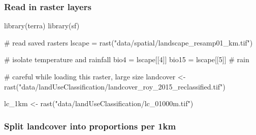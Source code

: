 \documentclass[
]{article}
\newenvironment{Shaded}{}{}
\newcommand{\CommentTok}[1]{\textcolor[rgb]{0.00,0.50,0.00}{#1}}
\newcommand{\DecValTok}[1]{#1}
\newcommand{\KeywordTok}[1]{\textcolor[rgb]{0.00,0.00,1.00}{#1}}
\newcommand{\NormalTok}[1]{#1}
\newcommand{\StringTok}[1]{\textcolor[rgb]{0.00,0.50,0.50}{#1}}
\begin{document}
\hypertarget{read-in-raster-layers}{%
\subsubsection{Read in raster layers}\label{read-in-raster-layers}}

\begin{Shaded}
\begin{Highlighting}[]
\KeywordTok{library}\NormalTok{(terra)}
\KeywordTok{library}\NormalTok{(sf)}
\end{Highlighting}
\end{Shaded}

\begin{Shaded}
\begin{Highlighting}[]
\CommentTok{# read saved rasters}
\NormalTok{lscape =}\StringTok{ }\KeywordTok{rast}\NormalTok{(}\StringTok{"data/spatial/landscape_resamp01_km.tif"}\NormalTok{)}

\CommentTok{# isolate temperature and rainfall}
\NormalTok{bio4 =}\StringTok{ }\NormalTok{lscape[[}\DecValTok{4}\NormalTok{]] }
\NormalTok{bio15 =}\StringTok{ }\NormalTok{lscape[[}\DecValTok{5}\NormalTok{]] }\CommentTok{# rain}

\CommentTok{# careful while loading this raster, large size}
\NormalTok{landcover <-}\StringTok{ }\KeywordTok{rast}\NormalTok{(}\StringTok{"data/landUseClassification/landcover_roy_2015_reclassified.tif"}\NormalTok{)}

\NormalTok{lc_1km <-}\StringTok{ }\KeywordTok{rast}\NormalTok{(}\StringTok{"data/landUseClassification/lc_01000m.tif"}\NormalTok{)}
\end{Highlighting}
\end{Shaded}

\hypertarget{split-landcover-into-proportions-per-1km}{%
\subsubsection{Split landcover into proportions per 1km}\label{split-landcover-into-proportions-per-1km}}
\end{document}
